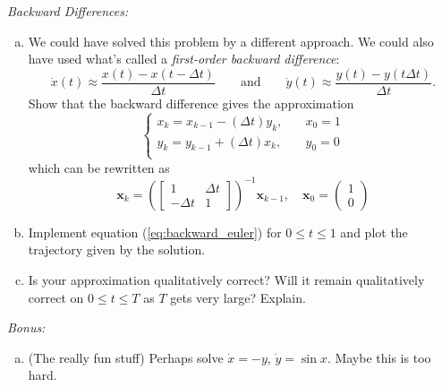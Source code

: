 \textit{Backward Differences:}
\begin{enumerate}[(a),resume]
    \item We could have solved this problem by a different approach. We could also have used what's called a \textit{first-order backward difference}:
    \begin{equation} 
    \label{eq:backward_difference}
    \dot{x}(t) \approx \frac{x(t) - x(t - \Delta t)}{\Delta t} \qquad \text{and} \qquad \dot{y}(t) \approx \frac{y(t) - y(t  \Delta t)}{\Delta t}.
    \end{equation}
    Show that the backward difference gives the approximation
    \begin{equation}
    \label{eq:backward_euler}
     \begin{cases} x_{k} = x_{k-1} - (\Delta t) y_k, & \quad x_0 = 1\\  y_{k} = y_{k-1} + (\Delta t) x_k, & \quad y_0 = 0\\  \end{cases}
    \end{equation}
    which can be rewritten as
   \begin{equation*} 
    \bm{x}_{k} 
    = \left(\begin{bmatrix} 1 & \Delta t \\  -\Delta t & 1\end{bmatrix}\right)^{-1} \bm{x}_{k-1}, \quad \bm{x}_0 = \begin{pmatrix} 1\\0 \end{pmatrix}
    \end{equation*}
    \item Implement equation (\ref{eq:backward_euler}) for $0 \leq t \leq 1$ and plot the trajectory given by the solution. 
    \item Is your approximation qualitatively correct? Will it remain qualitatively correct on $0 \leq t \leq T$ as $T$ gets very large? Explain.
\end{enumerate}
\textit{Bonus:}
\begin{enumerate}[(a),resume]
    \item (The really fun stuff) Perhaps solve $\dot{x} = -y$, $\dot{y} = \sin x$.  Maybe this is too hard.
\end{enumerate}
\newpage


